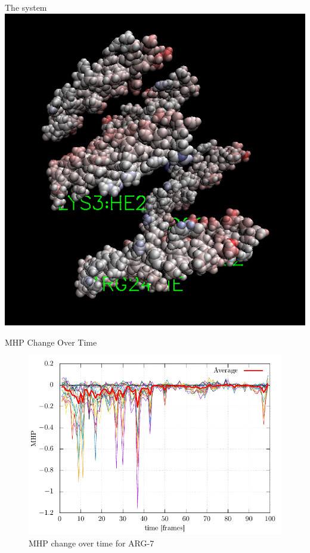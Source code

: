 \documentclass{beamer}
\begin{document}
\begin{frame}{The system}
    \centering
    \includegraphics[scale=0.25]{protein_labels.png}
\end{frame}
\begin{frame}{MHP Change Over Time}
	\centering
	\begin{figure}[h!]
		\caption{MHP change over time for ARG-7}
		\includegraphics[scale=0.75]{ARG07_graph.pdf}
	\end{figure}
\end{frame}
\end{document}
